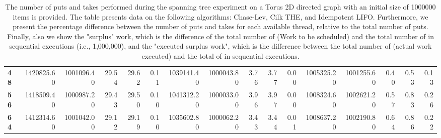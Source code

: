 \begin{table}[!ht]
{\begin{tabular}{lrrrrrrrrrrrrrrr}
\textbf{48} & 1420825.60 & 1001096.40 &          29.54 &       29.62 &                 0.11 & 1039141.40 & 1000043.80 &           3.76 &        3.77 &                 0.00 &      1005325.20 & 1001255.60 &           0.40 &        0.53 &                 0.13 \\
\textbf{56} & 1418509.40 & 1000987.20 &          29.43 &       29.50 &                 0.10 & 1041312.20 & 1000033.00 &           3.96 &        3.97 &                 0.00 &      1008324.60 & 1002621.20 &           0.57 &        0.83 &                 0.26 \\
\textbf{64} & 1412314.60 & 1001042.00 &          29.12 &       29.19 &                 0.10 & 1035602.80 & 1000062.20 &           3.43 &        3.44 &                 0.01 &      1008637.20 & 1002190.80 &           0.64 &        0.86 &                 0.22 \\
\bottomrule
\end{tabular}}
\label{difference-Torus_2D_directed-1000000-CHASELEV-CILK-IDEMPOTENT_LIFO}
\caption{The number of puts and takes performed during the
    spanning tree experiment on a Torus 2D directed graph with an initial size
    of 1000000 items is provided. The table presents data on the
    following algorithms: Chase-Lev, Cilk THE, and
    Idempotent LIFO. Furthermore, we present the percentage difference
    between the number of puts and takes for each available thread,
    relative to the total number of puts. Finally, also we show the
    "surplus" work, which is the difference of the total number of
    \Puts (Work to be scheduled) and the total number of \Puts in
    sequential executions (i.e., 1,000,000), and the "executed surplus
    work", which is the difference between the total number of \Takes
    (actual work executed) and the total of \Takes in sequential
    executions.}
\end{table}
